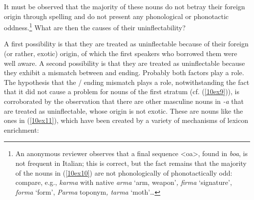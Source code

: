 \documentclass[output=paper,colorlinks,citecolor=brown]{langscibook}
\begin{document}
It must be observed that the majority of these nouns do not betray their foreign origin through spelling and do not present any phonological or phonotactic oddness.\footnote{An anonymous reviewer observes that a final sequence \textless oa\textgreater, found in \emph{boa}, is not frequent in Italian; this is correct, but the fact remains that the majority of the nouns in (\ref{10ex10}) are not phonologically of phonotactically odd: compare, e.g., \emph{karma} with native \emph{arma} `arm, weapon'\emph{, firma} `signature', \emph{forma} `form', \emph{Parma} toponym\emph{, tarma} `moth'\ldots{}} What are then the causes of their uninflectability?

A first possibility is that they are treated as uninflectable because of their foreign (or rather, exotic) origin, of which the first speakers who borrowed them were well aware. A second possibility is that they are treated as uninflectable because they exhibit a mismatch between  and ending. Probably both factors play a role. The hypothesis that the  / ending mismatch plays a role, notwithstanding the fact that it did not cause a problem for nouns of the first stratum (cf. (\ref{10ex9})), is corroborated by the observation that there are other masculine nouns in \emph{-a} that are treated as uninflectable, whose origin is not exotic. These are nouns like the ones in (\ref{10ex11}), which have been created by a variety of mechanisms of lexicon enrichment:
\end{document}
